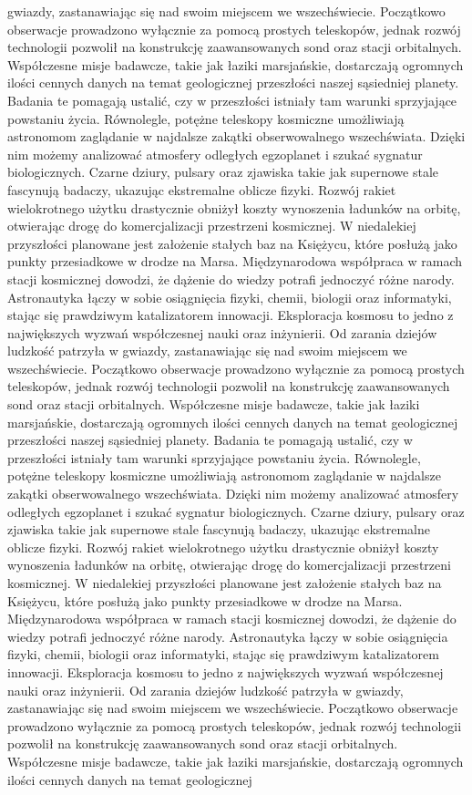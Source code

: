 \documentclass[12pt,a4paper]{article}
\begin{document}
gwiazdy, zastanawiając się nad swoim miejscem we wszechświecie. Początkowo obserwacje prowadzono wyłącznie za pomocą prostych teleskopów, jednak rozwój technologii pozwolił na konstrukcję zaawansowanych sond oraz stacji orbitalnych. Współczesne misje badawcze, takie jak łaziki marsjańskie, dostarczają ogromnych ilości cennych danych na temat geologicznej przeszłości naszej sąsiedniej planety. Badania te pomagają ustalić, czy w przeszłości istniały tam warunki sprzyjające powstaniu życia. Równolegle, potężne teleskopy kosmiczne umożliwiają astronomom zaglądanie w najdalsze zakątki obserwowalnego wszechświata. Dzięki nim możemy analizować atmosfery odległych egzoplanet i szukać sygnatur biologicznych. Czarne dziury, pulsary oraz zjawiska takie jak supernowe stale fascynują badaczy, ukazując ekstremalne oblicze fizyki. Rozwój rakiet wielokrotnego użytku drastycznie obniżył koszty wynoszenia ładunków na orbitę, otwierając drogę do komercjalizacji przestrzeni kosmicznej. W niedalekiej przyszłości planowane jest założenie stałych baz na Księżycu, które posłużą jako punkty przesiadkowe w drodze na Marsa. Międzynarodowa współpraca w ramach stacji kosmicznej dowodzi, że dążenie do wiedzy potrafi jednoczyć różne narody. Astronautyka łączy w sobie osiągnięcia fizyki, chemii, biologii oraz informatyki, stając się prawdziwym katalizatorem innowacji. Eksploracja kosmosu to jedno z największych wyzwań współczesnej nauki oraz inżynierii. Od zarania dziejów ludzkość patrzyła w gwiazdy, zastanawiając się nad swoim miejscem we wszechświecie. Początkowo obserwacje prowadzono wyłącznie za pomocą prostych teleskopów, jednak rozwój technologii pozwolił na konstrukcję zaawansowanych sond oraz stacji orbitalnych. Współczesne misje badawcze, takie jak łaziki marsjańskie, dostarczają ogromnych ilości cennych danych na temat geologicznej przeszłości naszej sąsiedniej planety. Badania te pomagają ustalić, czy w przeszłości istniały tam warunki sprzyjające powstaniu życia. Równolegle, potężne teleskopy kosmiczne umożliwiają astronomom zaglądanie w najdalsze zakątki obserwowalnego wszechświata. Dzięki nim możemy analizować atmosfery odległych egzoplanet i szukać sygnatur biologicznych. Czarne dziury, pulsary oraz zjawiska takie jak supernowe stale fascynują badaczy, ukazując ekstremalne oblicze fizyki. Rozwój rakiet wielokrotnego użytku drastycznie obniżył koszty wynoszenia ładunków na orbitę, otwierając drogę do komercjalizacji przestrzeni kosmicznej. W niedalekiej przyszłości planowane jest założenie stałych baz na Księżycu, które posłużą jako punkty przesiadkowe w drodze na Marsa. Międzynarodowa współpraca w ramach stacji kosmicznej dowodzi, że dążenie do wiedzy potrafi jednoczyć różne narody. Astronautyka łączy w sobie osiągnięcia fizyki, chemii, biologii oraz informatyki, stając się prawdziwym katalizatorem innowacji. Eksploracja kosmosu to jedno z największych wyzwań współczesnej nauki oraz inżynierii. Od zarania dziejów ludzkość patrzyła w gwiazdy, zastanawiając się nad swoim miejscem we wszechświecie. Początkowo obserwacje prowadzono wyłącznie za pomocą prostych teleskopów, jednak rozwój technologii pozwolił na konstrukcję zaawansowanych sond oraz stacji orbitalnych. Współczesne misje badawcze, takie jak łaziki marsjańskie, dostarczają ogromnych ilości cennych danych na temat geologicznej 
\end{document}
